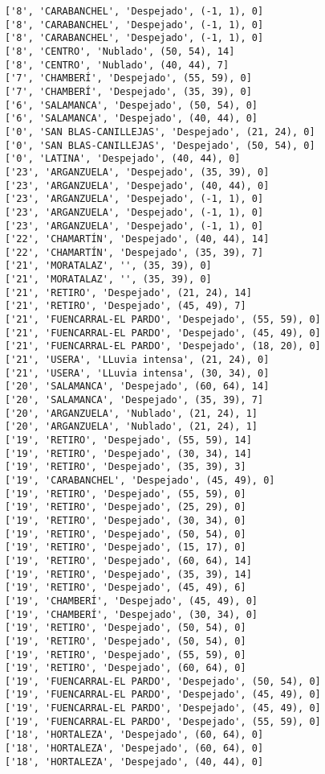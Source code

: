 \documentclass[11pt]{article}
\begin{document}
\begin{Verbatim}[commandchars=\\\{\}]
['8', 'CARABANCHEL', 'Despejado', (-1, 1), 0]
['8', 'CARABANCHEL', 'Despejado', (-1, 1), 0]
['8', 'CARABANCHEL', 'Despejado', (-1, 1), 0]
['8', 'CENTRO', 'Nublado', (50, 54), 14]
['8', 'CENTRO', 'Nublado', (40, 44), 7]
['7', 'CHAMBERÍ', 'Despejado', (55, 59), 0]
['7', 'CHAMBERÍ', 'Despejado', (35, 39), 0]
['6', 'SALAMANCA', 'Despejado', (50, 54), 0]
['6', 'SALAMANCA', 'Despejado', (40, 44), 0]
['0', 'SAN BLAS-CANILLEJAS', 'Despejado', (21, 24), 0]
['0', 'SAN BLAS-CANILLEJAS', 'Despejado', (50, 54), 0]
['0', 'LATINA', 'Despejado', (40, 44), 0]
['23', 'ARGANZUELA', 'Despejado', (35, 39), 0]
['23', 'ARGANZUELA', 'Despejado', (40, 44), 0]
['23', 'ARGANZUELA', 'Despejado', (-1, 1), 0]
['23', 'ARGANZUELA', 'Despejado', (-1, 1), 0]
['23', 'ARGANZUELA', 'Despejado', (-1, 1), 0]
['22', 'CHAMARTÍN', 'Despejado', (40, 44), 14]
['22', 'CHAMARTÍN', 'Despejado', (35, 39), 7]
['21', 'MORATALAZ', '', (35, 39), 0]
['21', 'MORATALAZ', '', (35, 39), 0]
['21', 'RETIRO', 'Despejado', (21, 24), 14]
['21', 'RETIRO', 'Despejado', (45, 49), 7]
['21', 'FUENCARRAL-EL PARDO', 'Despejado', (55, 59), 0]
['21', 'FUENCARRAL-EL PARDO', 'Despejado', (45, 49), 0]
['21', 'FUENCARRAL-EL PARDO', 'Despejado', (18, 20), 0]
['21', 'USERA', 'LLuvia intensa', (21, 24), 0]
['21', 'USERA', 'LLuvia intensa', (30, 34), 0]
['20', 'SALAMANCA', 'Despejado', (60, 64), 14]
['20', 'SALAMANCA', 'Despejado', (35, 39), 7]
['20', 'ARGANZUELA', 'Nublado', (21, 24), 1]
['20', 'ARGANZUELA', 'Nublado', (21, 24), 1]
['19', 'RETIRO', 'Despejado', (55, 59), 14]
['19', 'RETIRO', 'Despejado', (30, 34), 14]
['19', 'RETIRO', 'Despejado', (35, 39), 3]
['19', 'CARABANCHEL', 'Despejado', (45, 49), 0]
['19', 'RETIRO', 'Despejado', (55, 59), 0]
['19', 'RETIRO', 'Despejado', (25, 29), 0]
['19', 'RETIRO', 'Despejado', (30, 34), 0]
['19', 'RETIRO', 'Despejado', (50, 54), 0]
['19', 'RETIRO', 'Despejado', (15, 17), 0]
['19', 'RETIRO', 'Despejado', (60, 64), 14]
['19', 'RETIRO', 'Despejado', (35, 39), 14]
['19', 'RETIRO', 'Despejado', (45, 49), 6]
['19', 'CHAMBERÍ', 'Despejado', (45, 49), 0]
['19', 'CHAMBERÍ', 'Despejado', (30, 34), 0]
['19', 'RETIRO', 'Despejado', (50, 54), 0]
['19', 'RETIRO', 'Despejado', (50, 54), 0]
['19', 'RETIRO', 'Despejado', (55, 59), 0]
['19', 'RETIRO', 'Despejado', (60, 64), 0]
['19', 'FUENCARRAL-EL PARDO', 'Despejado', (50, 54), 0]
['19', 'FUENCARRAL-EL PARDO', 'Despejado', (45, 49), 0]
['19', 'FUENCARRAL-EL PARDO', 'Despejado', (45, 49), 0]
['19', 'FUENCARRAL-EL PARDO', 'Despejado', (55, 59), 0]
['18', 'HORTALEZA', 'Despejado', (60, 64), 0]
['18', 'HORTALEZA', 'Despejado', (60, 64), 0]
['18', 'HORTALEZA', 'Despejado', (40, 44), 0]

\end{Verbatim}
\end{document}
